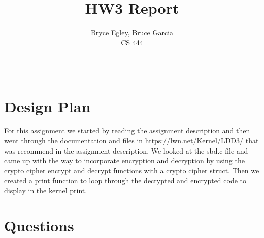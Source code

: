 \documentclass{article}
\begin{document}

\title{HW3 Report} %
\author{Bryce Egley, Bruce Garcia\\CS 444} %

\maketitle
\hrule


%
%

\section*{Design Plan}
For this assignment we started by reading the assignment description and then
went through the documentation and files in https://lwn.net/Kernel/LDD3/ that
was recommend in the assignment description. We looked at the sbd.c file and
came up with the way to incorporate encryption and decryption by using the
crypto cipher encrypt and decrypt functions with a crypto cipher struct. Then
we created a print function to loop through the decrypted and encrypted code to
display in the kernel print.
\newline


\section*{Questions}
\end{document}
